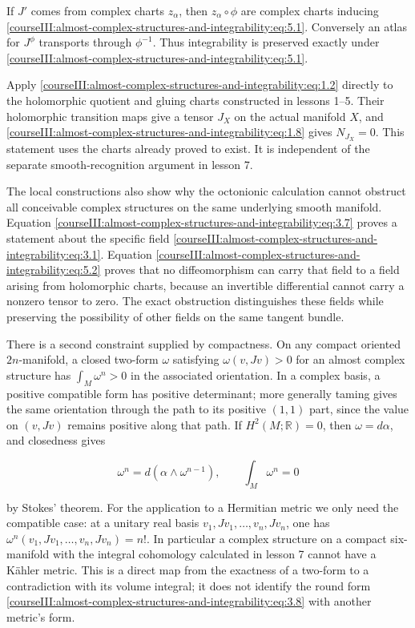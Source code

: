 If \(J'\) comes from complex charts \(z_\alpha\), then \(z_\alpha\circ\phi\) are complex charts inducing \eqref{courseIII:almost-complex-structures-and-integrability:eq:5.1}. Conversely an atlas for \(J^\phi\) transports through \(\phi^{-1}\). Thus integrability is preserved exactly under \eqref{courseIII:almost-complex-structures-and-integrability:eq:5.1}.

Apply \eqref{courseIII:almost-complex-structures-and-integrability:eq:1.2} directly to the holomorphic quotient and gluing charts constructed in lessons 1--5. Their holomorphic transition maps give a tensor \(J_X\) on the actual manifold \(X\), and \eqref{courseIII:almost-complex-structures-and-integrability:eq:1.8} gives \(N_{J_X}=0\). This statement uses the charts already proved to exist. It is independent of the separate smooth-recognition argument in lesson 7.

The local constructions also show why the octonionic calculation cannot obstruct all conceivable complex structures on the same underlying smooth manifold. Equation \eqref{courseIII:almost-complex-structures-and-integrability:eq:3.7} proves a statement about the specific field \eqref{courseIII:almost-complex-structures-and-integrability:eq:3.1}. Equation \eqref{courseIII:almost-complex-structures-and-integrability:eq:5.2} proves that no diffeomorphism can carry that field to a field arising from holomorphic charts, because an invertible differential cannot carry a nonzero tensor to zero. The exact obstruction distinguishes these fields while preserving the possibility of other fields on the same tangent bundle.

There is a second constraint supplied by compactness. On any compact oriented \(2n\)-manifold, a closed two-form \(\omega\) satisfying \(\omega(v,Jv)>0\) for an almost complex structure has \(\int_M\omega^n>0\) in the associated orientation. In a complex basis, a positive compatible form has positive determinant; more generally taming gives the same orientation through the path to its positive \((1,1)\) part, since the value on \((v,Jv)\) remains positive along that path. If \(H^2(M;\mathbb R)=0\), then \(\omega=d\alpha\), and closedness gives

\begin{equation}
\omega^n=d(\alpha\wedge\omega^{n-1}),\qquad
\int_M\omega^n=0
\label{courseIII:almost-complex-structures-and-integrability:eq:5.3}
\end{equation}

by Stokes' theorem. For the application to a Hermitian metric we only need the compatible case: at a unitary real basis \(v_1,Jv_1,\ldots,v_n,Jv_n\), one has \(\omega^n(v_1,Jv_1,\ldots,v_n,Jv_n)=n!\). In particular a complex structure on a compact six-manifold with the integral cohomology calculated in lesson 7 cannot have a Kähler metric. This is a direct map from the exactness of a two-form to a contradiction with its volume integral; it does not identify the round form \eqref{courseIII:almost-complex-structures-and-integrability:eq:3.8} with another metric's form.

